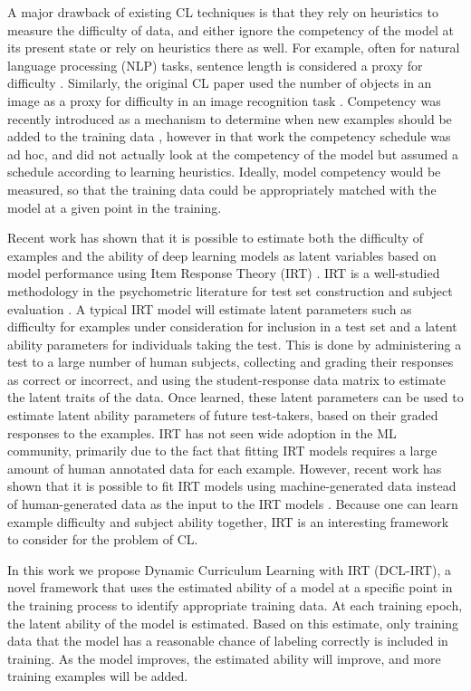 \documentclass[letterpaper]{article} %
\begin{document}
A major drawback of existing CL techniques is that they rely on heuristics to measure the difficulty of data, and either ignore the competency of the model at its present state or rely on heuristics there as well.
For example, often for natural language processing (NLP) tasks, sentence length is considered a proxy for difficulty \cite{bengio_curriculum_2009,platanios_competence-based_2019}.
Similarly, the original CL paper used the number of objects in an image as a proxy for difficulty in an image recognition task \cite{bengio_curriculum_2009}.
Competency was recently introduced as a mechanism to determine when new examples should be added to the training data \cite{platanios_competence-based_2019}, however in that work the competency schedule was ad hoc, and did not actually look at the competency of the model but assumed a schedule according to learning heuristics. 
Ideally, model competency would be measured, so that the training data could be appropriately matched with the model at a given point in the training.

Recent work has shown that it is possible to estimate both the difficulty of examples and the ability of deep learning models as latent variables based on model performance using Item Response Theory (IRT) \cite{lalor_learning_2019}.
IRT is a well-studied methodology in the psychometric literature for test set construction and subject evaluation \cite{baker_item_2004}.
A typical IRT model will estimate latent parameters such as difficulty for examples under consideration for inclusion in a test set and a latent ability parameters for individuals taking the test.
This is done by administering a test to a large number of human subjects, collecting and grading their responses as correct or incorrect, and using the student-response data matrix to estimate the latent traits of the data.
Once learned, these latent parameters can be used to estimate latent ability parameters of future test-takers, based on their graded responses to the examples.
IRT has not seen wide adoption in the ML community, primarily due to the fact that fitting IRT models requires a large amount of human annotated data for each example.
However, recent work has shown that it is possible to fit IRT models using machine-generated data instead of human-generated data as the input to the IRT models \cite{lalor_learning_2019}.
Because one can learn example difficulty and subject ability together, IRT is an interesting framework to consider for the problem of CL. 

In this work we propose Dynamic Curriculum Learning with IRT (DCL-IRT), a novel framework that uses the estimated ability of a model at a specific point in the training process to identify appropriate training data.
At each training epoch, the latent ability of the model is estimated.
Based on this estimate, only training data that the model has a reasonable chance of labeling correctly is included in training.
As the model improves, the estimated ability will improve, and more training examples will be added.
\end{document}
